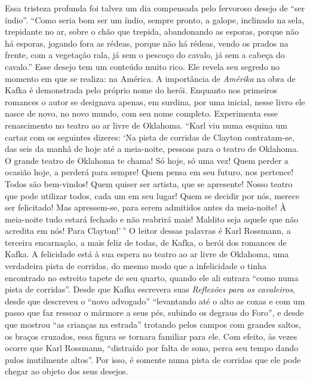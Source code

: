 Essa tristeza profunda foi talvez um dia compensada pelo fervoroso
desejo de ``ser índio''. ``Como seria bom ser um índio, sempre pronto, a
galope, inclinado na sela, trepidante no ar, sobre o chão que trepida,
abandonando as esporas, porque não há esporas, jogando fora as rédeas,
porque não há rédeas, vendo os prados na frente, com a vegetação rala,
já sem o pescoço do cavalo, já sem a cabeça do cavalo.'' Esse desejo tem
um conteúdo muito rico. Ele revela seu segredo no momento em que se
realiza: na América. A importância de \textit{Amérika} na obra de Kafka é
demonstrada pelo próprio nome do herói. Enquanto nos primeiros romances
o autor se designava apenas, em surdina, por uma inicial, nesse livro
ele nasce de novo, no novo mundo, com seu nome completo. Experimenta
esse renascimento no teatro ao ar livre de Oklahoma. ``Karl viu numa
esquina um cartaz com os seguintes dizeres: `Na pista de corridas de
Clayton contratam-se, das seis da manhã de hoje até a meia-noite,
pessoas para o teatro de Oklahoma. O grande teatro de Oklahoma te chama!
Só hoje, só uma vez! Quem perder a ocasião hoje, a perderá para sempre!
Quem pensa em seu futuro, nos pertence! Todos são bem-vindos! Quem
quiser ser artista, que se apresente! Nosso teatro que pode utilizar
todos, cada um em seu lugar! Quem se decidir por nós, merece ser
felicitado! Mas apressem-se, para serem admitidos antes da meia-noite! À
meia-noite tudo estará fechado e não reabrirá mais! Maldito seja aquele
que não acredita em nós! Para Clayton!'\,'' O leitor dessas palavras é
Karl Rossmann, a terceira encarnação, a mais feliz de todas, de Kafka, o
herói dos romances de Kafka. A felicidade está à sua espera no teatro ao
ar livre de Oklahoma, uma verdadeira pista de corridas, do mesmo modo
que a infelicidade o tinha encontrado no estreito tapete de seu quarto,
quando ele ali entrara ``como numa pista de corridas''. Desde que Kafka
escrevera suas \textit{Reflexões para os cavaleiros}, desde que descreveu o
``novo advogado'' ``levantando até o alto as coxas e com um passo que
faz ressoar o mármore a seus pés, subindo os degraus do Foro'', e desde
que mostrou ``as crianças na estrada'' trotando pelos campos com grandes
saltos, os braços cruzados, essa figura se tornara familiar para ele.
Com efeito, às vezes ocorre que Karl Rossmann, ``distraído por falta de
sono, perca seu tempo dando pulos inutilmente altos''. Por isso, é
somente numa pista de corridas que ele pode chegar ao objeto dos seus
desejos.

